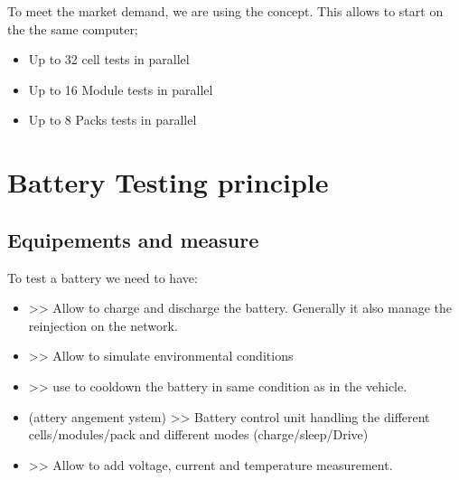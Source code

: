 \documentclass[letterpaper,10pt,english]{jupyterBook}
\begin{document}
\sphinxAtStartPar
To meet the market demand, we are using the  concept.
This allows to start on the the same computer;
\begin{itemize}
\item {} 
\sphinxAtStartPar
Up to 32 cell tests in parallel

\item {} 
\sphinxAtStartPar
Up to 16 Module tests in parallel

\item {} 
\sphinxAtStartPar
Up to 8 Packs tests in parallel

\end{itemize}


\section{Battery Testing principle}
\label{\detokenize{01_General-presentation:battery-testing-principle}}

\subsection{Equipements and measure}
\label{\detokenize{01_General-presentation:equipements-and-measure}}
\sphinxAtStartPar
To test a battery we need to have:
\begin{itemize}
\item {} 
\sphinxAtStartPar
{} >> Allow to charge and discharge the battery. Generally it also manage the re\sphinxhyphen{}injection on the network.

\item {} 
\sphinxAtStartPar
{} \sphinxhyphen{}  >> Allow to simulate environmental conditions

\item {} 
\sphinxAtStartPar
{} \sphinxhyphen{}  >> use to cooldown the battery in same condition as in the vehicle.

\item {} 
\sphinxAtStartPar
{} (attery angement ystem) \sphinxhyphen{}  >> Battery control unit handling the different cells/modules/pack and different modes (charge/sleep/Drive)

\item {} 
\sphinxAtStartPar
{} \sphinxhyphen{}  >> Allow to add voltage, current and temperature measurement.

\end{itemize}
\end{document}
